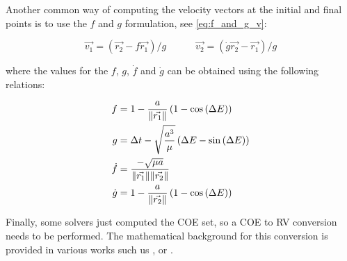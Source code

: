 Another common way of computing the velocity vectors at the initial and final
points is to use the $f$ and $g$ formulation, see \ref{eq:f_and_g_v}:

\begin{equation}
  \vec{v_1} = (\vec{r_2} - f \vec{r_1}) / g \quad\quad\quad
  \vec{v_2} = (\dot{g} \vec{r_2} - \vec{r_1}) / g
  \label{eq:f_and_g_v}
\end{equation}

where the values for the $f$, $g$, $\dot{f}$ and $\dot{g}$ can be obtained using
the following relations:

\begin{align}
  f       & = 1 - \frac{a}{\lVert\vec{r_1}\rVert} \left(1 - \cos{(\Delta E)} \right)          \\
  g       & = \Delta t - \sqrt{\frac{a^3}{\mu}} \left(\Delta E - \sin{(\Delta E)}\right) \\
  \dot{f} & = \frac{-\sqrt{\mu a}}{\lVert\vec{r_1}\rVert \lVert\vec{r_2}\rVert}                    \\
  \dot{g} & = 1 - \frac{a}{\lVert\vec{r_2}\rVert} \left(1 - \cos{(\Delta E)} \right)
\end{align}

Finally, some solvers just computed the COE set, so a COE to RV conversion needs
to be performed. The mathematical background for this conversion is provided in
various works such us \cite{bate1971}, \cite{vallado2013} or
\cite{curtis2020}.
